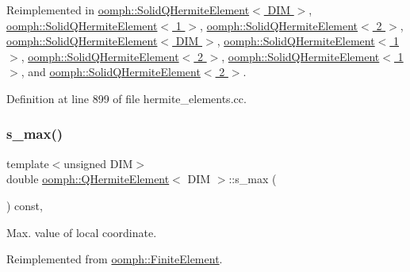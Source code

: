Reimplemented in \hyperlink{classoomph_1_1SolidQHermiteElement_aabd23592071d29249154d7cde20f2d88}{oomph\+::\+Solid\+Q\+Hermite\+Element$<$ D\+I\+M $>$}, \hyperlink{classoomph_1_1SolidQHermiteElement_aabd23592071d29249154d7cde20f2d88}{oomph\+::\+Solid\+Q\+Hermite\+Element$<$ 1 $>$}, \hyperlink{classoomph_1_1SolidQHermiteElement_aabd23592071d29249154d7cde20f2d88}{oomph\+::\+Solid\+Q\+Hermite\+Element$<$ 2 $>$}, \hyperlink{classoomph_1_1SolidQHermiteElement_adb8a603a0f50a7944be7af4a1cd0abc5}{oomph\+::\+Solid\+Q\+Hermite\+Element$<$ D\+I\+M $>$}, \hyperlink{classoomph_1_1SolidQHermiteElement_adb8a603a0f50a7944be7af4a1cd0abc5}{oomph\+::\+Solid\+Q\+Hermite\+Element$<$ 1 $>$}, \hyperlink{classoomph_1_1SolidQHermiteElement_adb8a603a0f50a7944be7af4a1cd0abc5}{oomph\+::\+Solid\+Q\+Hermite\+Element$<$ 2 $>$}, \hyperlink{classoomph_1_1SolidQHermiteElement_a29b211e63df67028435a71ac732d47ad}{oomph\+::\+Solid\+Q\+Hermite\+Element$<$ 1 $>$}, and \hyperlink{classoomph_1_1SolidQHermiteElement_a29b211e63df67028435a71ac732d47ad}{oomph\+::\+Solid\+Q\+Hermite\+Element$<$ 2 $>$}.



Definition at line 899 of file hermite\+\_\+elements.\+cc.

\mbox{\label{classoomph_1_1QHermiteElement_a9f603f92a0aae12188dcb6bcf105b8b9}} 
\subsubsection{\texorpdfstring{s\+\_\+max()}{s\_max()}}
{\footnotesize\ttfamily template$<$unsigned D\+IM$>$ \\
double \hyperlink{classoomph_1_1QHermiteElement}{oomph\+::\+Q\+Hermite\+Element}$<$ D\+IM $>$\+::s\+\_\+max (\begin{DoxyParamCaption}{ }\end{DoxyParamCaption}) const\hspace{0.3cm}{\ttfamily [inline]}, {\ttfamily [virtual]}}



Max. value of local coordinate. 



Reimplemented from \hyperlink{classoomph_1_1FiniteElement_a64adbe9356927133686ab53f00341ea8}{oomph\+::\+Finite\+Element}.



